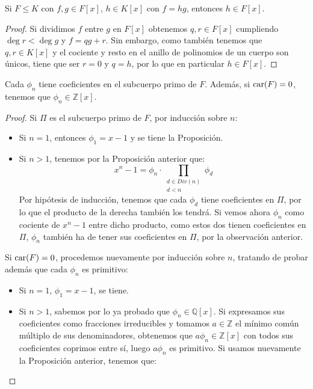 \begin{observacion}
    Si $F\leq K$ con $f,g\in F[x]$, $h\in K[x]$ con $f = hg$, entonces $h \in F[x]$.
    \begin{proof}
        Si dividimos $f$ entre $g$ en $F[x]$ obtenemos $q,r\in F[x]$ cumpliendo $\deg r < \deg g$ y $f = qg+r$. Sin embargo, como también tenemos que $q,r\in K[x]$ y el cociente y resto en el anillo de polinomios de un cuerpo son únicos, tiene que ser $r=0$ y $q=h$, por lo que en particular $h\in F[x]$.
    \end{proof}
\end{observacion}

\begin{prop}
    Cada $\phi_n$ tiene coeficientes en el subcuerpo primo de $F$. Además, si $\operatorname{car}(F) = 0$, tenemos que $\phi_n\in \mathbb{Z}[x]$.
    \begin{proof}
        Si $\Pi$ es el subcuerpo primo de $F$, por inducción sobre $n$:
        \begin{itemize}
            \item Si $n=1$, entonces $\phi_1 = x-1$ y se tiene la Proposición.
            \item Si $n>1$, tenemos por la Proposición anterior que:
                \begin{equation*}
                    x^n-1 = \phi_n \cdot \prod_{\substack{d \in Div(n)\\d<n}}\phi_d
                \end{equation*}
                Por hipótesis de inducción, tenemos que cada $\phi_d$ tiene coeficientes en $\Pi$, por lo que el producto de la derecha también los tendrá. Si vemos ahora $\phi_n$ como cociente de $x^n-1$ entre dicho producto, como estos dos tienen coeficientes en $\Pi$, $\phi_n$ también ha de tener sus coeficientes en $\Pi$, por la observación anterior.
        \end{itemize}
        Si $\operatorname{car}(F) = 0$, procedemos nuevamente por inducción sobre $n$, tratando de probar además que cada $\phi_n$ es primitivo:
        \begin{itemize}
            \item Si $n=1$, $\phi_1 = x-1$, se tiene.
            \item Si $n>1$, sabemos por lo ya probado que $\phi_n \in \mathbb{Q}[x]$. Si expresamos sus coeficientes como fracciones irreducibles y tomamos $a\in \mathbb{Z}$ el mínimo común múltiplo de sus denominadores, obtenemos que $a\phi_n \in \mathbb{Z}[x]$ con todos sus coeficientes coprimos entre sí, luego $a\phi_n$ es primitivo. Si usamos nuevamente la Proposición anterior, tenemos que:

\end{itemize}
\end{proof}
\end{prop}
